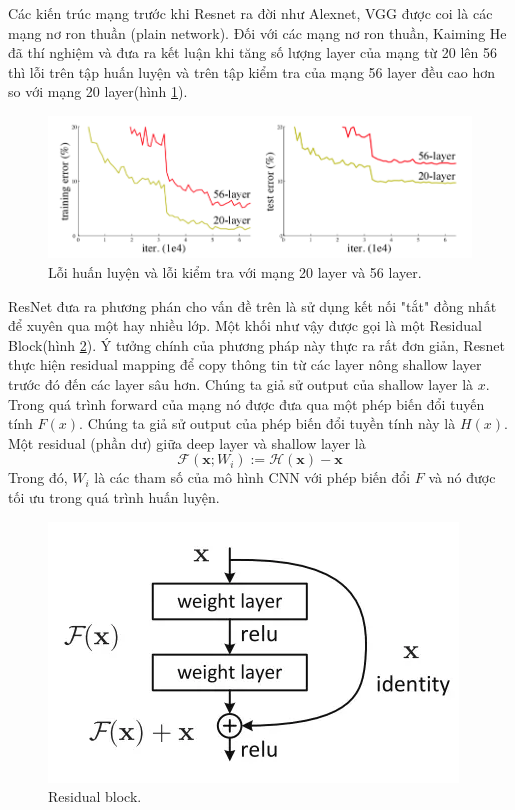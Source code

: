 Các kiến trúc mạng trước khi Resnet ra đời như Alexnet, VGG được coi là các mạng nơ ron thuần (plain network). Đối với các mạng nơ ron thuần, Kaiming He\cite{resnet} đã thí nghiệm và đưa ra kết luận khi tăng số lượng layer của mạng từ 20 lên 56 thì lỗi trên tập huấn luyện và trên tập kiểm tra của mạng 56 layer đều cao hơn so với mạng 20 layer(hình \ref{fig:resnet_vanishing_gradient}). 
\begin{figure}[H]
	\centering
	\includegraphics[width=1\linewidth]{images/resnet_vanishing_gradient}
	\caption{Lỗi huấn luyện và lỗi kiểm tra với mạng 20 layer và 56 layer.}
	\label{fig:resnet_vanishing_gradient}
\end{figure} 
ResNet đưa ra phương phán cho vấn đề trên là sử dụng kết nối "tắt" đồng nhất để xuyên qua một hay nhiều lớp. Một khối như vậy được gọi là một Residual Block(hình \ref{fig:resnet_residual_block}). Ý tưởng chính của phương pháp này thực ra rất đơn giản, Resnet thực hiện residual mapping để copy thông tin từ các layer nông shallow layer trước đó đến các layer sâu hơn. Chúng ta giả sử output của shallow layer là $x$. Trong quá trình forward của mạng nó được đưa qua một phép biến đổi tuyến tính $F(x)$. Chúng ta giả sử output của phép biến đổi tuyền tính này là $H(x)$. Một residual (phần dư) giữa deep layer và shallow layer là
$$\mathcal{F}(\mathbf{x}; W_i) := \mathcal{H}(\mathbf{x}) - \mathbf{x}$$
Trong đó, $W_i$ là các tham số của mô hình CNN với phép biến đổi $F$ và nó được tối ưu trong quá trình huấn luyện.
\begin{figure}[H]
	\centering
	\includegraphics[width=0.5\linewidth]{images/resnet_residual_block}
	\caption{Residual block.}
	\label{fig:resnet_residual_block}
\end{figure}
